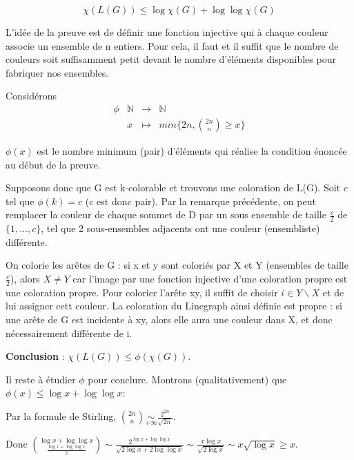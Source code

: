 

\begin{lemme}
	\[ \chi(L(G)) \le \log \chi(G) +  \log  \log \chi(G) \]
\end{lemme}

\begin{preuve}
	L'idée de la preuve est de définir une fonction injective qui à chaque couleur associe un ensemble de n entiers. Pour cela, il faut et il suffit que le nombre de couleurs soit suffisamment petit devant le nombre d'éléments disponibles pour fabriquer nos ensembles.
	
	Considérons 
	\begin{equation}
		\begin{array}{l|rcl}
			\phi & \mathbb{N} & \longrightarrow & \mathbb{N} \\
			& x & \longmapsto & min\{2n, \binom{2n}{n} \ge x\} \end{array}
	\end{equation}
	
	$\phi(x)$ est le nombre minimum (pair) d'éléments qui réalise la condition énoncée au début de la preuve.
	
	Supposons donc que G est k-colorable et trouvons une coloration de L(G). Soit $c$ tel que $\phi(k) = c$ (c est donc pair). Par la remarque précédente, on peut remplacer la couleur de chaque sommet de D par un sous ensemble de taille $\frac{c}{2}$ de $\{1,...,c\}$, tel que 2 sous-ensembles adjacents ont une couleur (ensembliste) différente.
	
	On colorie les arêtes de G : si x et y sont coloriés par X et Y (ensembles de taille $\frac{c}{2}$), alors $X \neq Y$ car l'image par une fonction injective d'une coloration propre est une coloration propre. Pour colorier l'arête xy, il suffit de choisir $i \in Y\backslash X$ et de lui assigner cett couleur. 
	La coloration du Linegraph ainsi définie est propre : si une arête de G est incidente à xy, alors elle aura une couleur dans X, et donc nécessairement différente de i.
	
	\textbf{Conclusion} :  $\chi(L(G)) \le \phi(\chi(G))$.
	
	Il reste à étudier $\phi$ pour conclure. Montrons (qualitativement) que $\phi(x) \le \log x + \log \log x$:  
	
	Par la formule de Stirling, $\binom{2n}{n} \underset{+\infty}{\sim} \frac{2^{2n}}{\sqrt{2n}}$.
	
	Donc $\binom{\log x + \log \log x}{\frac{\log x + \log \log x}{2}} \sim \frac{2^{\log x + \log \log x}}{\sqrt{2 \log x + 2 \log \log x}} \sim \frac{x \log x}{\sqrt{2 \log x}} \sim x \sqrt{\log x} \ge x$.
	
\end{preuve}


